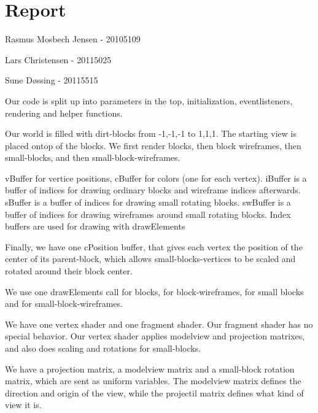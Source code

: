 \section{Report}

Rasmus Mosbech Jensen - 20105109

Lars Christensen - 20115025

Sune D\o ssing - 20115515 


Our code is split up into parameters in the 
top, initialization, eventlisteners, rendering and helper functions.

Our world is filled with dirt-blocks from -1,-1,-1 to 1,1,1.
The starting view is placed ontop of the blocks.
We first render blocks, then block wireframes, then small-blocks, and then small-block-wireframes.


vBuffer for vertice positions, cBuffer for colors (one for each vertex).
iBuffer is a buffer of indices for drawing ordinary blocks and wireframe indices afterwards.
sBuffer is a buffer of indices for drawing small rotating blocks.
swBuffer is a buffer of indices for drawing wireframes around small rotating blocks.
Index buffers are used for drawing with drawElements

Finally, we have one cPosition buffer, 
that gives each vertex the position of the center of its parent-block, 
which allows small-blocks-vertices to be scaled and rotated around their block center.


We use one drawElements call for blocks, for block-wireframes, for small blocks and for small-block-wireframes.


We have one vertex shader and one fragment shader. Our fragment shader has no special behavior.
Our vertex shader applies modelview and projection matrixes, and also does scaling and rotations for small-blocks.


We have a projection matrix, a modelview matrix and a small-block rotation matrix, which are sent as uniform variables.
The modelview matrix defines the direction and origin of the view, while the projectil matrix defines what kind of view it is.

